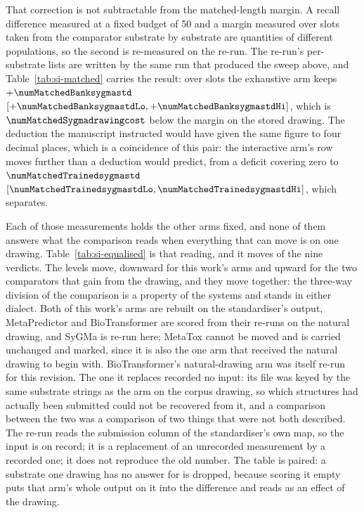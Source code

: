 \documentclass[journal=jcisd8,manuscript=suppinfo,layout=onecolumn]{achemso}
\begin{document}
That correction is not subtractable from the matched-length margin. A recall difference measured at
a fixed budget of 50 and a margin measured over
\numMatchedBanksygmaSlots{} slots taken from the comparator substrate by substrate are quantities
of different populations, so the second is re-measured on the re-run. The re-run's per-substrate
lists are written by the same run that produced the sweep above,
and Table~\ref{tab:si-matched} carries the result: over \numMatchedBanksygmastdSlots{} slots
the exhaustive arm keeps $+\numMatchedBanksygmastd$
$[+\numMatchedBanksygmastdLo, +\numMatchedBanksygmastdHi]$, which is
$\numMatchedSygmadrawingcost$ below the margin on the stored drawing. The deduction the manuscript
instructed would have given the same figure to four decimal places, which is a coincidence of this
pair: the interactive arm's row moves further than a deduction would predict, from
a deficit covering zero to $\numMatchedTrainedsygmastd$
$[\numMatchedTrainedsygmastdLo, \numMatchedTrainedsygmastdHi]$, which separates.



Each of those measurements holds the other arms fixed, and none of them answers what the comparison
reads when everything that can move is on one
drawing. Table~\ref{tab:si-equalised} is that reading, and it moves \numEqualisedMovedWord{}
of the nine verdicts. The levels move, downward for this work's arms and upward for the two
comparators that gain from the drawing, and they move together: the three-way division of the
comparison is a property of the systems and stands in either dialect. Both of this work's arms are
rebuilt on
the standardiser's output, MetaPredictor and BioTransformer are scored from their re-runs on the
natural drawing, and SyGMa is re-run here; MetaTox cannot be moved and is carried unchanged and
marked, since it is also the one arm that received the natural drawing to begin with.
BioTransformer's natural-drawing arm was itself re-run for this revision. The one it replaces
recorded no input: its file was keyed by the same substrate strings as the arm on the corpus
drawing, so which structures had actually been submitted could not be recovered from it, and a
comparison between the two was a comparison of two things that were not both described. The re-run
reads the submission column of the standardiser's own map, so the input is on record; it is a
replacement of an unrecorded measurement by a recorded one; it does not reproduce the old
number. The table is paired: a substrate one drawing has no answer for is dropped, because scoring it
empty puts that arm's whole output on it into the difference and
reads as an effect of the drawing.
\end{document}
